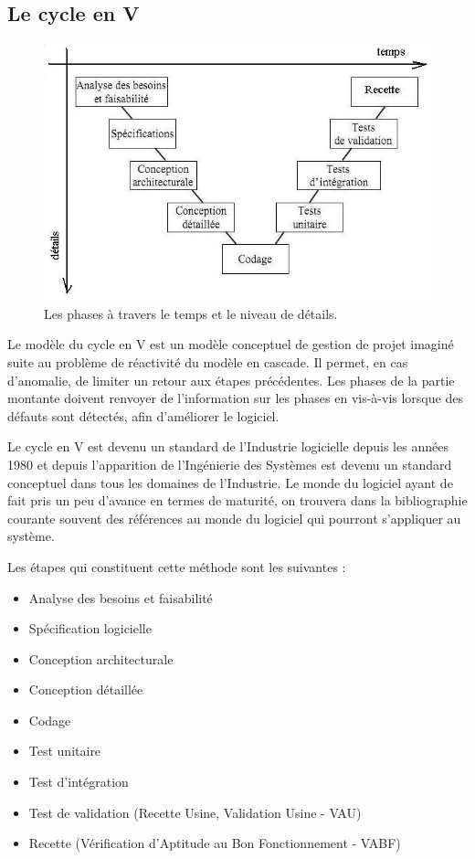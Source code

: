     \subsection{Le cycle en V}

\begin{figure}[!h]
\center
\includegraphics[width=12cm]{images/cyclev.png}
\caption{Les phases à travers le temps et le niveau de détails.}
\label{cyclev}
\end{figure}

Le modèle du cycle en V est un modèle conceptuel de gestion de projet imaginé suite au problème de réactivité du modèle en cascade. Il permet, en cas d'anomalie, de limiter un retour aux étapes précédentes. Les phases  de la partie montante doivent renvoyer de l'information sur les phases en vis-à-vis lorsque des défauts sont détectés, afin d'améliorer le logiciel.

Le cycle en V est devenu un standard de l'Industrie logicielle depuis les années 1980 et depuis l'apparition de l'Ingénierie des Systèmes est devenu un standard conceptuel dans tous les domaines de l'Industrie. Le monde du logiciel ayant de fait pris un peu d'avance en termes de maturité, on trouvera dans la bibliographie courante souvent des références au monde du logiciel qui pourront s'appliquer au système.

Les étapes qui constituent cette méthode sont les suivantes :
\begin{itemize}
    \item Analyse des besoins et faisabilité
    \item Spécification logicielle
    \item Conception architecturale
    \item Conception détaillée
    \item Codage
    \item Test unitaire
    \item Test d'intégration
    \item Test de validation (Recette Usine, Validation Usine - VAU)
    \item Recette (Vérification d'Aptitude au Bon Fonctionnement - VABF)
\end{itemize}\medskip
 
